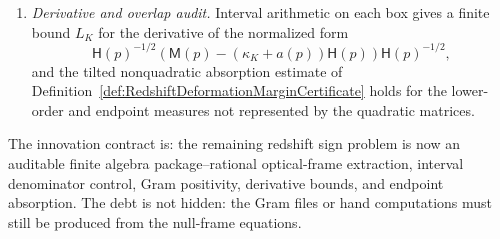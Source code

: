 \begin{definition}
\begin{enumerate}
    \item \emph{Derivative and overlap audit.}  Interval arithmetic on each box
    gives a finite bound $L_K$ for the derivative of the normalized form
    \[
        \mathsf H(p)^{-1/2}
        \left(
            \mathsf M(p)-(\kappa_K+a(p))\mathsf H(p)
        \right)
        \mathsf H(p)^{-1/2},
    \]
    and the tilted nonquadratic absorption estimate of
    Definition~\ref{def:RedshiftDeformationMarginCertificate} holds for the
    lower-order and endpoint measures not represented by the quadratic matrices.
\end{enumerate}
The innovation contract is: the remaining redshift sign problem is now an
auditable finite algebra package--rational optical-frame extraction, interval
denominator control, Gram positivity, derivative bounds, and endpoint
absorption.  The debt is not hidden: the Gram files or hand computations must
still be produced from the null-frame equations.
\end{definition}

